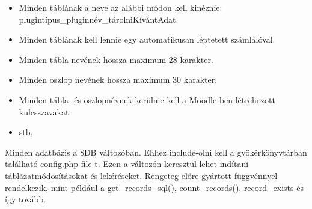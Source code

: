 \begin{itemize}
    \item Minden táblának a neve az alábbi módon kell kinéznie: plugintípus\_pluginnév\_tárolniKívántAdat.
    \item Minden táblának kell lennie egy automatikusan léptetett számlálóval.
    \item Minden tábla nevének hossza maximum 28 karakter.
    \item Minden oszlop nevének hossza maximum 30 karakter.
    \item Minden tábla- és oszlopnévnek kerülnie kell a Moodle-ben létrehozott kulcsszavakat.
    \item stb.
\end{itemize}

Minden adatbázis a \$DB változóban. Ehhez include-olni kell a gyökérkönyvtárban található config.php file-t. Ezen a változón keresztül lehet indítani táblázatmódosításokat és lekéréseket. Rengeteg előre gyártott függvénnyel rendelkezik, mint például a get\_records\_sql(), count\_records(), record\_exists és így tovább. 